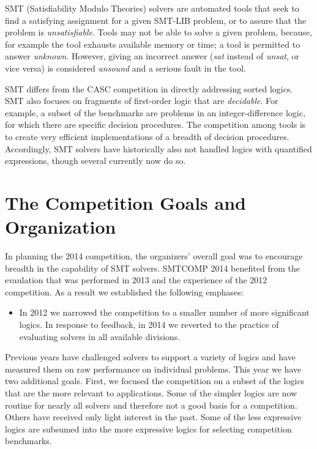 \documentclass[twosize,11pt]{article}
\begin{document}
SMT (Satisfiability Modulo Theories) solvers are automated tools that seek to find a satisfying assignment for a given SMT-LIB problem, or to assure that the problem is \textit{unsatisfiable}.
Tools may not be able to solve a given problem, because, for example the tool exhausts available memory or time; a tool is permitted to answer \textit{unknown}. However, giving an incorrect answer (\textit{sat} instead of \textit{unsat}, or vice versa) is considered \textit{unsound} and a serious fault in the tool.

SMT differs from the CASC competition \cite{TBD} in directly addressing sorted logics. SMT also focuses on fragments of first-order logic that are \textit{decidable}. For example, a subset of the benchmarks are problems in an integer-difference logic, for which there are specific decision procedures. The competition among tools is to create very efficient implementations of a breadth of decision procedures. Accordingly, SMT solvers have historically also not handled logics with quantified expressions, though several currently now do so.

\section{The Competition Goals and Organization}
\label{sec:goals}

In planning the 2014 competition, the organizers' overall goal was to encourage breadth
in the capability of SMT solvers. SMTCOMP 2014 benefited from the evaulation that was performed in 2013 and the experience of the 2012 competition. As a result we established the following emphases:
\begin{itemize}
\item In 2012 we narrowed the competition to a smaller number of more significant logics. In response to feedback, in 2014 we reverted to the practice of evaluating solvers in all available divisions.


\end{itemize}

Previous years have challenged solvers to support a variety of logics and
have measured them on raw performance on individual problems. This year we have two additional goals. First, we
focused the competition on a subset of the logics that are the more relevant to applications. Some of the 
simpler logics are now routine for nearly all solvers and therefore not a good basis for a competition. Others have 
received only light interest in the past. Some of the less expressive logics are subsumed into the more expressive logics
for selecting competition benchmarks.
\end{document}
